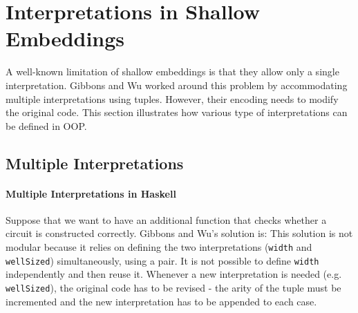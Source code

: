 \section{Interpretations in Shallow Embeddings}

A well-known limitation of shallow embeddings is that they allow only a single
interpretation. Gibbons and Wu worked around this problem by accommodating
multiple interpretations using tuples. However, their encoding needs to modify
the original code. This section illustrates how various type of
interpretations can be defined in OOP.
\begin{comment}
Although a modular solution based on \cite{swierstra2008data}
is also presented, it complicates the encoding dramatically and may prevent pratical use.
OO approach, on the contrary, provides modular yet simple solution of defining
multiple interpretations. 
\end{comment}


\subsection{Multiple Interpretations}
\paragraph{Multiple Interpretations in Haskell}
Suppose that we want to have an additional function that checks whether a circuit is
constructed correctly. Gibbons and Wu's solution is:
\noindent This solution is not modular because it relies 
on defining the two interpretations (\lstinline{width} and
\lstinline{wellSized}) simultaneously, using a pair. It is not
possible to define \lstinline{width} independently and then reuse it.
Whenever a new interpretation is needed (e.g. \lstinline{wellSized}), the
original code has to be revised -
the arity of the tuple must be incremented and the new interpretation has to be
appended to each case.


